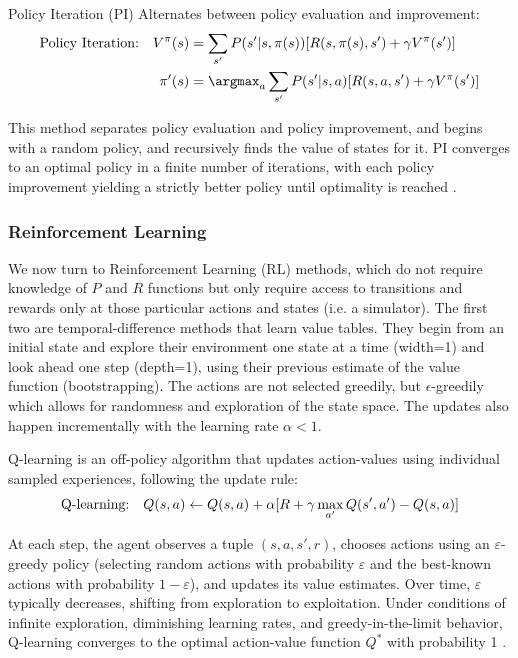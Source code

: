 Policy Iteration (PI) Alternates between policy evaluation and improvement:
\begin{align}
 \text{Policy Iteration:\quad} V^{\pi}(s) &= \sum_{s'} P(s'|s,\pi(s))[R(s,\pi(s),s') + \gamma V^{\pi}(s')] \\
\pi'(s) &= \argmax_a \sum_{s'} P(s'|s,a)[R(s,a,s') + \gamma V^{\pi}(s')]
\end{align}

This method separates policy evaluation and policy improvement, and begins with a random policy, and recursively finds the value of states for it. PI converges to an optimal policy in a finite number of iterations, with each policy improvement yielding a strictly better policy until optimality is reached \cite{bertsekas1996}.


\subsubsection{Reinforcement Learning}

We now turn to Reinforcement Learning (RL) methods, which do not require knowledge of $P$ and $R$ functions but only require access to transitions and rewards only at those particular actions and states (i.e. a simulator). The first two are temporal-difference methods that learn value tables. They begin from an initial state and explore their environment one state at a time (width=1) and look ahead one step (depth=1), using their previous estimate of the value function (bootstrapping). The actions are not selected greedily, but $\epsilon$-greedily which allows for randomness and exploration of the state space. The updates also happen incrementally with the learning rate $\alpha<1$.  

Q-learning is an off-policy algorithm that updates action-values using individual sampled experiences, following the update rule:
\begin{equation}
\text{Q-learning:\quad} Q(s,a) \leftarrow Q(s,a) + \alpha [R + \gamma \max_{a'} Q(s',a') - Q(s,a)]
\end{equation}

At each step, the agent observes a tuple $(s,a,s',r)$, chooses actions using an $\varepsilon$-greedy policy (selecting random actions with probability $\varepsilon$ and the best-known actions with probability $1-\varepsilon$), and updates its value estimates. Over time, $\varepsilon$ typically decreases, shifting from exploration to exploitation. Under conditions of infinite exploration, diminishing learning rates, and greedy-in-the-limit behavior, Q-learning converges to the optimal action-value function $Q^*$ with probability 1 \citep{watkins1992_paper}.

